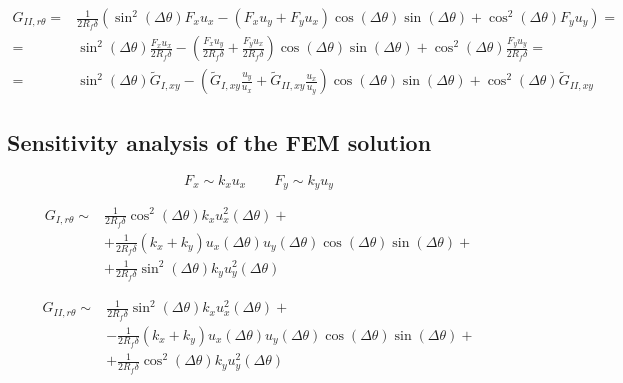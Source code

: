 \documentclass[a4paper]{jpconf}
\begin{document}
\begin{equation}
\begin{split}
G_{II,r\theta} =&\frac{1}{2R_{f}\delta}\left(\sin^{2}\left(\Delta\theta\right) F_{x}u_{x}-\left(F_{x}u_{y}+F_{y}u_{x}\right)\cos\left(\Delta\theta\right)\sin\left(\Delta\theta\right)+\cos^{2}\left(\Delta\theta\right)F_{y}u_{y}\right)=\\
=&\sin^{2}\left(\Delta\theta\right)\frac{ F_{x}u_{x}}{2R_{f}\delta}-\left(\frac{F_{x}u_{y}}{2R_{f}\delta}+\frac{F_{y}u_{x}}{2R_{f}\delta}\right)\cos\left(\Delta\theta\right)\sin\left(\Delta\theta\right)+\cos^{2}\left(\Delta\theta\right)\frac{F_{y}u_{y}}{2R_{f}\delta}=\\
=&\sin^{2}\left(\Delta\theta\right)\widetilde{G}_{I,xy}-\left(\widetilde{G}_{I,xy}\frac{u_{y}}{u_{x}}+\widetilde{G}_{II,xy}\frac{u_{x}}{u_{y}}\right)\cos\left(\Delta\theta\right)\sin\left(\Delta\theta\right)+\cos^{2}\left(\Delta\theta\right)\widetilde{G}_{II,xy}
\end{split}
\end{equation}

\subsection{Sensitivity analysis of the FEM solution}

\begin{equation}
F_{x}\sim k_{x}u_{x}\qquad F_{y}\sim k_{y}u_{y}
\end{equation}

\begin{equation}
\begin{split}
G_{I,r\theta} \sim&\frac{1}{2R_{f}\delta}\cos^{2}\left(\Delta\theta\right) k_{x}u^{2}_{x}\left(\Delta\theta\right)+\\
&+\frac{1}{2R_{f}\delta}\left(k_{x}+k_{y}\right)u_{x}\left(\Delta\theta\right)u_{y}\left(\Delta\theta\right)\cos\left(\Delta\theta\right)\sin\left(\Delta\theta\right)+\\
&+\frac{1}{2R_{f}\delta}\sin^{2}\left(\Delta\theta\right)k_{y}u^{2}_{y}\left(\Delta\theta\right)
\end{split}
\end{equation}

\begin{equation}
\begin{split}
G_{II,r\theta} \sim&\frac{1}{2R_{f}\delta}\sin^{2}\left(\Delta\theta\right) k_{x}u^{2}_{x}\left(\Delta\theta\right)+\\
&-\frac{1}{2R_{f}\delta}\left(k_{x}+k_{y}\right)u_{x}\left(\Delta\theta\right)u_{y}\left(\Delta\theta\right)\cos\left(\Delta\theta\right)\sin\left(\Delta\theta\right)+\\
&+\frac{1}{2R_{f}\delta}\cos^{2}\left(\Delta\theta\right)k_{y}u^{2}_{y}\left(\Delta\theta\right)
\end{split}
\end{equation}
\end{document}
